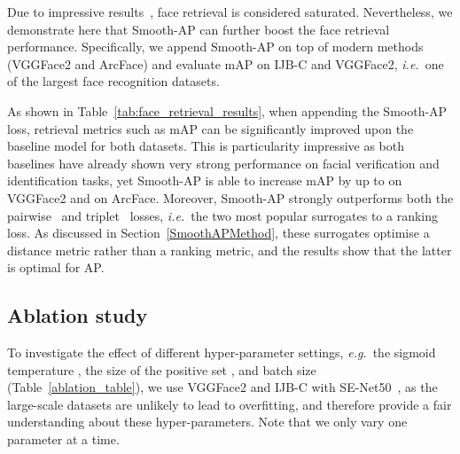 \documentclass[runningheads]{llncs}
\providecommand{\ie}[0]{\emph{i.e.}}
\providecommand{\eg}[0]{\emph{e.g.}}
\begin{document}
Due to impressive results~\cite{Cao18,Deng19}, face retrieval is considered saturated. Nevertheless, we demonstrate here that Smooth-AP can further boost the face retrieval performance. 
Specifically, 
we append Smooth-AP on top of modern methods (VGGFace2 and ArcFace) and evaluate mAP on IJB-C and 
VGGFace2, \ie\ one of the largest face recognition datasets. 

As shown in Table~\ref{tab:face_retrieval_results},
when appending the Smooth-AP loss,
retrieval metrics such as mAP can be significantly improved upon the baseline model for both datasets. 
This is particularity impressive as both baselines have already shown very strong performance on facial verification and identification tasks, 
yet Smooth-AP is able to increase mAP by up to  on VGGFace2 and  on ArcFace. 
Moreover, Smooth-AP strongly outperforms both the pairwise~\cite{Chopra05}  
and triplet~\cite{Schroff15} losses, 
\ie\ the two most popular surrogates to a ranking loss. 
As discussed in Section~\ref{SmoothAPMethod}, 
these surrogates optimise a distance metric rather than a ranking metric, 
and the results show that the latter is optimal for AP. 


\subsection{Ablation study}
\label{ablation}

To investigate the effect of different hyper-parameter settings, 
\eg\ the sigmoid temperature , the size of the positive set , 
and batch size  (Table~\ref{ablation_table}),
we use VGGFace2 and IJB-C with SE-Net50~\cite{Cao18},
as the large-scale datasets are unlikely to lead to overfitting, 
and therefore provide a fair understanding about these hyper-parameters.
Note that we only vary one parameter at a time.\\
\end{document}
